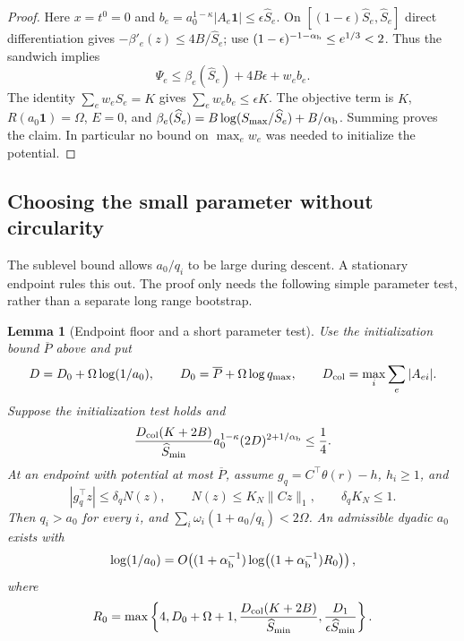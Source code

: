 \documentclass[11pt]{article}
\newtheorem{lemma}[theorem]{Lemma}
\theoremstyle{definition}\newtheorem{definition}[theorem]{Definition}
\theoremstyle{remark}\newtheorem{remark}[theorem]{Remark}
\newcommand{\one}{\mathbf1}
\begin{document}
\begin{proof}
Here $x=t^0=0$ and
$b_e=a_0^{1-\kappa}|A_e\one|\le\epsilon\widehat S_e$.
On $[(1-\epsilon)\widehat S_e,\widehat S_e]$ direct differentiation
gives $-\beta'_e(z)\le4B/\widehat S_e$; use
$(1-\epsilon)^{-1-\alpha_{\rm b}}\le e^{1/3}<2$.
Thus the sandwich implies
\[
 \Psi_e\le\beta_e(\widehat S_e)+4B\epsilon+w_eb_e.
\]
The identity $\sum_e w_e\widehat S_e=K$ gives
$\sum_e w_eb_e\le\epsilon K$.  The objective term is $K$,
$R(a_0\one)=\Omega$, $E=0$, and
$\beta_e(\widehat S_e)=B\log(S_{\max}/\widehat S_e)+B/\alpha_{\rm b}$.
Summing proves the claim.  In particular no bound on $\max_e w_e$
was needed to initialize the potential.
\end{proof}

\subsection{Choosing the small parameter without circularity}
\label{sec:endpoint-scaling-floor}

The sublevel bound allows $a_0/q_i$ to be large during descent.  A
stationary endpoint rules this out.  The proof only needs the following
simple parameter test, rather than a separate long range bootstrap.

\begin{lemma}[Endpoint floor and a short parameter test]
\label{lem:endpoint-scaling-floor}
Use the initialization bound $\overline P$ above and put
\[
 D=D_0+\Omega\log(1/a_0),\qquad
 D_0=\overline P+\Omega\log q_{\max},\qquad
 D_{\rm col}=\max_i\sum_e|A_{ei}|.
\]
Suppose the initialization test holds and
\begin{equation}\label{eq:small-a0-test}
 \frac{D_{\rm col}(K+2B)}{\widehat S_{\min}}
       a_0^{1-\kappa}(2D)^{2+1/\alpha_{\rm b}}\le\frac14.
\end{equation}
At an endpoint with potential at most $\overline P$, assume
$g_q=C^\top\theta(r)-h$, $h_i\ge1$, and
\[
 |g_q^\top z|\le\delta_q N(z),\qquad
 N(z)\le K_N\|Cz\|_1,\qquad \delta_qK_N\le1.
\]
Then $q_i>a_0$ for every $i$, and
$\sum_i\omega_i(1+a_0/q_i)<2\Omega$.
An admissible dyadic $a_0$ exists with
\begin{equation}\label{eq:log-a0-size}
 \log(1/a_0)=O\!\left((1+\alpha_{\rm b}^{-1})
    \log\bigl((1+\alpha_{\rm b}^{-1})R_0\bigr)\right),
\end{equation}
where
\[
 R_0=\max\left\{4,D_0+\Omega+1,
  \frac{D_{\rm col}(K+2B)}{\widehat S_{\min}},
  \frac{D_1}{\epsilon\widehat S_{\min}}\right\}.
\]
\end{lemma}
\end{document}
